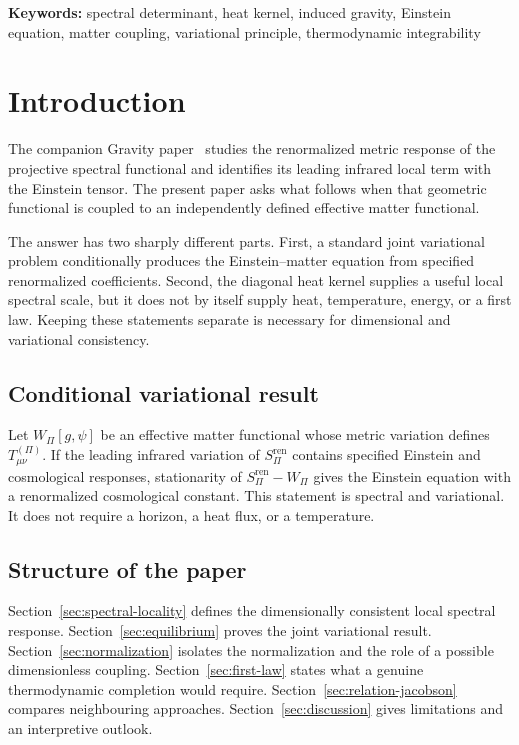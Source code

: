 \documentclass[12pt,a4paper]{article}
\theoremstyle{definition}
\newcommand{\Spi}{S_{\Pi}}
\begin{document}
  \noindent\textbf{Keywords:} spectral determinant, heat kernel, induced gravity,
  Einstein equation, matter coupling, variational principle, thermodynamic integrability

  \clearpage
  \tableofcontents
  \newpage

  \section{Introduction}
    \label{sec:intro}

    The companion Gravity paper~\cite{Beau2026h} studies the renormalized metric response of the projective
    spectral functional and identifies its leading infrared local term with the Einstein tensor.
    The present paper asks what follows when that geometric functional is coupled to an independently defined
    effective matter functional.

    The answer has two sharply different parts.
    First, a standard joint variational problem conditionally produces the Einstein--matter equation from specified
    renormalized coefficients.
    Second, the diagonal heat kernel supplies a useful local spectral scale, but it does not by itself supply heat,
    temperature, energy, or a first law.
    Keeping these statements separate is necessary for dimensional and variational consistency.

    \subsection{Conditional variational result}

      Let $W_\Pi[g,\psi]$ be an effective matter functional whose metric variation defines
      $T^{(\Pi)}_{\mu\nu}$.
      If the leading infrared variation of $\Spi^{\mathrm{ren}}$ contains specified Einstein and cosmological
      responses, stationarity of $\Spi^{\mathrm{ren}}-W_\Pi$ gives the Einstein equation with a renormalized
      cosmological constant.
      This statement is spectral and variational.
      It does not require a horizon, a heat flux, or a temperature.

    \subsection{Structure of the paper}

      Section~\ref{sec:spectral-locality} defines the dimensionally consistent local spectral response.
      Section~\ref{sec:equilibrium} proves the joint variational result.
      Section~\ref{sec:normalization} isolates the normalization and the role of a possible dimensionless coupling.
      Section~\ref{sec:first-law} states what a genuine thermodynamic completion would require.
      Section~\ref{sec:relation-jacobson} compares neighbouring approaches.
      Section~\ref{sec:discussion} gives limitations and an interpretive outlook.
\end{document}
